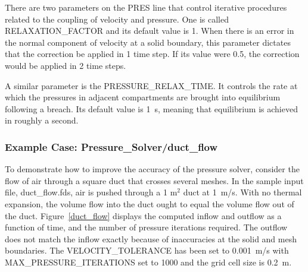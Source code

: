 \documentclass[11pt]{book}
\begin{document}
There are two parameters on the {\ct PRES} line that control iterative procedures related to the coupling of velocity and pressure. One is
called {\ct RELAXATION\_FACTOR} and its default value is 1. When there is an error in the normal component of velocity at a solid boundary, this
parameter dictates that the correction be applied in 1 time step. If its value were 0.5, the correction would be applied in 2 time steps.

A similar parameter is the {\ct PRESSURE\_RELAX\_TIME}. It controls the rate at which the pressures in adjacent compartments are brought into equilibrium following a
breach. Its default value is 1~s, meaning that equilibrium is achieved in roughly a second.


\subsubsection{Example Case: Pressure\_Solver/duct\_flow}

To demonstrate how to improve the accuracy of the pressure solver, consider the flow of air through a square duct that crosses several meshes. In the sample input file, {\ct duct\_flow.fds}, air is pushed through a 1 m$^2$ duct at 1~m/s. With no thermal expansion, the volume flow into the duct ought to equal the volume flow out of the
duct. Figure~\ref{duct_flow} displays the computed inflow and outflow as a function of time, and the number of pressure iterations required. The outflow does not match
the inflow exactly because of inaccuracies at the solid and mesh boundaries. The {\ct VELOCITY\_TOLERANCE} has been set to 0.001~m/s with {\ct MAX\_PRESSURE\_ITERATIONS} set to 1000 and the grid cell size is 0.2~m.
\end{document}
